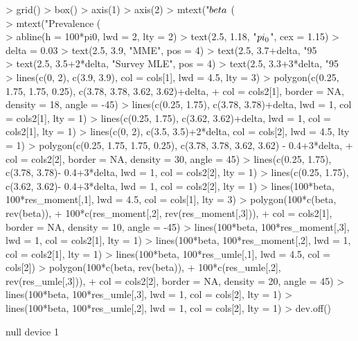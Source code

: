 \documentclass{article}
\begin{document}
\begin{Schunk}
\begin{Sinput}
> grid()
> box()
> axis(1)
> axis(2)
> mtext("$\\beta$ (\\%)", side = 1, line = 3, cex = 1.15)
> mtext("Prevalence (\\%)", side = 2, line = 3, cex = 1.15)
> abline(h = 100*pi0, lwd = 2, lty = 2)
> text(2.5, 1.18, "$\\pi_0$", cex = 1.15)
> delta = 0.03
> text(2.5, 3.9, "MME", pos = 4)
> text(2.5, 3.7+delta, "95\\% CI", pos = 4)
> text(2.5, 3.5+2*delta, "Survey MLE", pos = 4)
> text(2.5, 3.3+3*delta, "95\\% CI", pos = 4)
> lines(c(0, 2), c(3.9, 3.9), col = cols[1], lwd = 4.5, lty = 3)
> polygon(c(0.25, 1.75, 1.75, 0.25), c(3.78, 3.78, 3.62, 3.62)+delta,
+         col = cols2[1], border = NA, density = 18, angle = -45)
> lines(c(0.25, 1.75), c(3.78, 3.78)+delta, lwd = 1, col = cols2[1], lty = 1)
> lines(c(0.25, 1.75), c(3.62, 3.62)+delta, lwd = 1, col = cols2[1], lty = 1)
> lines(c(0, 2), c(3.5, 3.5)+2*delta, col = cols[2], lwd = 4.5, lty = 1)
> polygon(c(0.25, 1.75, 1.75, 0.25), c(3.78, 3.78, 3.62, 3.62) - 0.4+3*delta,
+         col = cols2[2], border = NA, density = 30, angle = 45)
> lines(c(0.25, 1.75), c(3.78, 3.78)- 0.4+3*delta, lwd = 1, col = cols2[2], lty = 1)
> lines(c(0.25, 1.75), c(3.62, 3.62)- 0.4+3*delta, lwd = 1, col = cols2[2], lty = 1)
> lines(100*beta, 100*res_moment[,1], lwd = 4.5, col = cols[1], lty = 3)
> polygon(100*c(beta, rev(beta)),
+         100*c(res_moment[,2], rev(res_moment[,3])),
+         col = cols2[1], border = NA, density = 10, angle = -45)
> lines(100*beta, 100*res_moment[,3], lwd = 1, col = cols2[1], lty = 1)
> lines(100*beta, 100*res_moment[,2], lwd = 1, col = cols2[1], lty = 1)
> lines(100*beta, 100*res_umle[,1], lwd = 4.5, col = cols[2])
> polygon(100*c(beta, rev(beta)),
+         100*c(res_umle[,2], rev(res_umle[,3])),
+         col = cols2[2], border = NA, density = 20, angle = 45)
> lines(100*beta, 100*res_umle[,3], lwd = 1, col = cols[2], lty = 1)
> lines(100*beta, 100*res_umle[,2], lwd = 1, col = cols[2], lty = 1)
> dev.off()
\end{Sinput}
\begin{Soutput}
null device 
          1 
\end{Soutput}
\end{Schunk}

\begin{figure}

\end{figure}

\begin{figure}

\end{figure}
\end{document}
